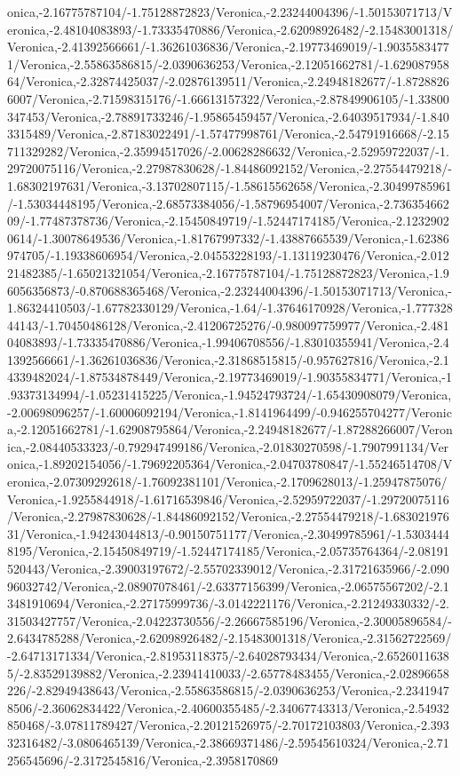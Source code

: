 {\begin{tikzternal}
onica,-2.16775787104/-1.75128872823/Veronica,-2.23244004396/-1.50153071713/Veronica,-2.48104083893/-1.73335470886/Veronica,-2.62098926482/-2.15483001318/Veronica,-2.41392566661/-1.36261036836/Veronica,-2.19773469019/-1.90355834771/Veronica,-2.55863586815/-2.0390636253/Veronica,-2.12051662781/-1.62908795864/Veronica,-2.32874425037/-2.02876139511/Veronica,-2.24948182677/-1.87288266007/Veronica,-2.71598315176/-1.66613157322/Veronica,-2.87849906105/-1.33800347453/Veronica,-2.78891733246/-1.95865459457/Veronica,-2.64039517934/-1.8403315489/Veronica,-2.87183022491/-1.57477998761/Veronica,-2.54791916668/-2.15711329282/Veronica,-2.35994517026/-2.00628286632/Veronica,-2.52959722037/-1.29720075116/Veronica,-2.27987830628/-1.84486092152/Veronica,-2.27554479218/-1.68302197631/Veronica,-3.13702807115/-1.58615562658/Veronica,-2.30499785961/-1.53034448195/Veronica,-2.68573384056/-1.58796954007/Veronica,-2.73635466209/-1.77487378736/Veronica,-2.15450849719/-1.52447174185/Veronica,-2.12329020614/-1.30078649536/Veronica,-1.81767997332/-1.43887665539/Veronica,-1.62386974705/-1.19338606954/Veronica,-2.04553228193/-1.13119230476/Veronica,-2.01221482385/-1.65021321054/Veronica,-2.16775787104/-1.75128872823/Veronica,-1.96056356873/-0.870688365468/Veronica,-2.23244004396/-1.50153071713/Veronica,-1.86324410503/-1.67782330129/Veronica,-1.64/-1.37646170928/Veronica,-1.77732844143/-1.70450486128/Veronica,-2.41206725276/-0.980097759977/Veronica,-2.48104083893/-1.73335470886/Veronica,-1.99406708556/-1.83010355941/Veronica,-2.41392566661/-1.36261036836/Veronica,-2.31868515815/-0.957627816/Veronica,-2.14339482024/-1.87534878449/Veronica,-2.19773469019/-1.90355834771/Veronica,-1.93373134994/-1.05231415225/Veronica,-1.94524793724/-1.65430908079/Veronica,-2.00698096257/-1.60006092194/Veronica,-1.8141964499/-0.946255704277/Veronica,-2.12051662781/-1.62908795864/Veronica,-2.24948182677/-1.87288266007/Veronica,-2.08440533323/-0.792947499186/Veronica,-2.01830270598/-1.7907991134/Veronica,-1.89202154056/-1.79692205364/Veronica,-2.04703780847/-1.55246514708/Veronica,-2.07309292618/-1.76092381101/Veronica,-2.1709628013/-1.25947875076/Veronica,-1.9255844918/-1.61716539846/Veronica,-2.52959722037/-1.29720075116/Veronica,-2.27987830628/-1.84486092152/Veronica,-2.27554479218/-1.68302197631/Veronica,-1.94243044813/-0.90150751177/Veronica,-2.30499785961/-1.53034448195/Veronica,-2.15450849719/-1.52447174185/Veronica,-2.05735764364/-2.08191520443/Veronica,-2.39003197672/-2.55702339012/Veronica,-2.31721635966/-2.09096032742/Veronica,-2.08907078461/-2.63377156399/Veronica,-2.06575567202/-2.13481910694/Veronica,-2.27175999736/-3.0142221176/Veronica,-2.21249330332/-2.31503427757/Veronica,-2.04223730556/-2.26667585196/Veronica,-2.30005896584/-2.6434785288/Veronica,-2.62098926482/-2.15483001318/Veronica,-2.31562722569/-2.64713171334/Veronica,-2.81953118375/-2.64028793434/Veronica,-2.65260116385/-2.83529139882/Veronica,-2.23941410033/-2.65778483455/Veronica,-2.02896658226/-2.82949438643/Veronica,-2.55863586815/-2.0390636253/Veronica,-2.23419478506/-2.36062834422/Veronica,-2.40600355485/-2.34067743313/Veronica,-2.54932850468/-3.07811789427/Veronica,-2.20121526975/-2.70172103803/Veronica,-2.39332316482/-3.0806465139/Veronica,-2.38669371486/-2.59545610324/Veronica,-2.71256545696/-2.3172545816/Veronica,-2.3958170869
\end{tikzternal}}
